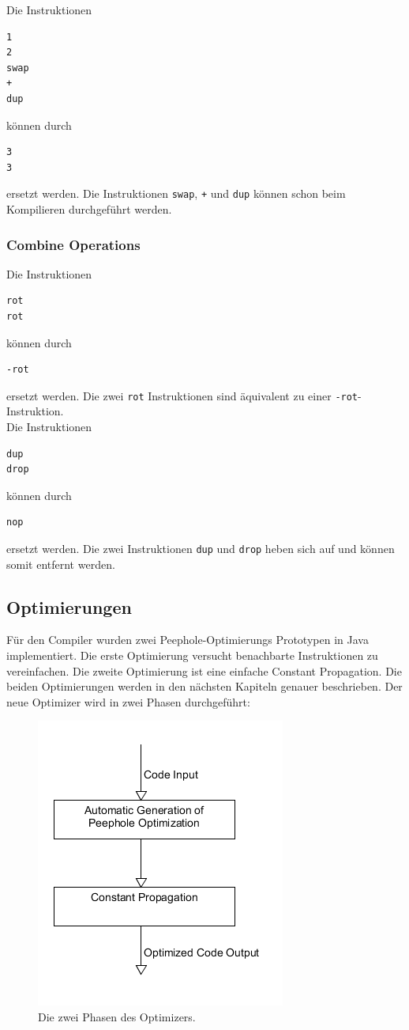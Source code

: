 Die Instruktionen
%
\begin{verbatim}
1
2
swap
+
dup
\end{verbatim}
%
können durch
%
\begin{verbatim}
3
3
\end{verbatim}
%
ersetzt werden. Die Instruktionen \verb!swap!, \verb!+! und \verb!dup! können schon beim Kompilieren durchgeführt werden.
\subsubsection{Combine Operations}
Die Instruktionen
%
\begin{verbatim}
rot
rot
\end{verbatim}
%
können durch
%
\begin{verbatim}
-rot
\end{verbatim}
%
ersetzt werden. Die zwei \verb!rot! Instruktionen sind äquivalent zu einer \verb!-rot!-Instruktion. \\Die Instruktionen
%
\begin{verbatim}
dup
drop
\end{verbatim}
%
können durch
%
\begin{verbatim}
nop
\end{verbatim}
%
ersetzt werden. Die zwei Instruktionen \verb!dup! und \verb!drop! heben sich auf und können somit entfernt werden.

\newpage

\subsection{Optimierungen}

Für den Compiler wurden zwei Peephole-Optimierungs Prototypen in Java implementiert. Die erste Optimierung versucht benachbarte Instruktionen zu vereinfachen. Die zweite Optimierung ist eine einfache Constant Propagation. Die beiden Optimierungen werden in den nächsten Kapiteln genauer beschrieben. Der neue Optimizer wird in zwei Phasen durchgeführt:

\begin{figure}[H]
	\centering
		\includegraphics[scale=0.6]{optimizer/optimizer.png}
		\caption{Die zwei Phasen des Optimizers.}
		\label{fig:optimizer}
\end{figure}

